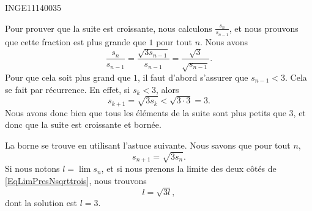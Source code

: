 \documentclass{article}
\begin{document}
\begin{corrige}{INGE11140035}

	Pour prouver que la suite est croissante, nous calculons $\frac{ s_n }{ s_{n-1} }$, et nous prouvons que cette fraction est plus grande que $1$ pour tout $n$. Nous avons
	\begin{equation}
		\frac{ s_n }{ s_{n-1} }=\frac{ \sqrt{3 s_{n-1}} }{ s_{n-1 }}=\frac{ \sqrt{3} }{ \sqrt{s_{n-1}} }.
	\end{equation}
	Pour que cela soit plus grand que $1$, il faut d'abord s'assurer que $s_{n-1}<3$. Cela se fait par récurrence. En effet, si $s_k<3$, alors
	\begin{equation}
		s_{k+1}=\sqrt{3s_k}<\sqrt{3\cdot 3}=3.
	\end{equation}
	Nous avons donc bien que tous les éléments de la suite sont plus petits que $3$, et donc que la suite est croissante et bornée. 

	La borne se trouve en utilisant l'astuce suivante. Nous savons que pour tout $n$, 
	\begin{equation}			\label{EqLimPresNsqrttrois}
		s_{n+1}=\sqrt{3s_n}.
	\end{equation}
	Si nous notons $l=\lim s_n$, et si nous prenons la limite des deux côtés de \eqref{EqLimPresNsqrttrois}, nous trouvons
	\begin{equation}
		l=\sqrt{3l},
	\end{equation}
	dont la solution est $l=3$.

\end{corrige}
\end{document}
